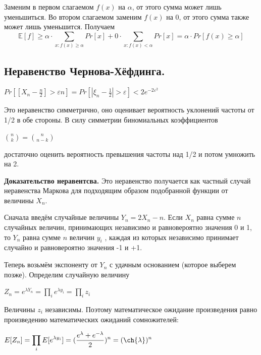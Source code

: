 \documentclass[a4paper, 10pt]{article}
\begin{document}
Заменим в первом слагаемом $f(x)$ на $\alpha$, от этого сумма может лишь уменьшиться. Во втором слагаемом заменим $f(x)$ на 0, от этого сумма также может лишь уменьшится. Получаем $$\mathbb{E}[f] \geqslant \alpha \cdot \sum_{x : f(x) \geqslant \alpha}Pr[x] + 0 \cdot \sum_{x : f(x) < \alpha}Pr[x] = \alpha \cdot Pr[f(x) \geqslant \alpha]$$


\subsection{Неравенство Чернова-Хёфдинга.}

\begin{center}
    $\displaystyle Pr[[X_n - \frac{n}{2}] > \varepsilon n] = Pr[|\xi_n - \frac{1}{2}| > \varepsilon] < 2e^{-2\varepsilon^2}$
\end{center}

Это неравенство симметрично, оно оценивает вероятность уклонений частоты от
1/2 в обе стороны. В силу симметрии биномиальных коэффициентов

\begin{center}
    $\displaystyle \binom{n}{k} = \binom{n}{n - k}$
\end{center}

достаточно оценить вероятность превышения частоты над 1/2 и потом умножить
на 2.

\textbf{Доказательство неравентсва.} Это неравенство получается как частный
случай неравенства Маркова для подходящим образом подобранной функции от
величины $X_n$.

Сначала введём случайные величины $Y_n = 2X_n - n$. Если $X_n$ равна сумме $n$
случайных величин, принимающих независимо и равновероятно значения 0 и 1, то
$Y_n$ равна сумме $n$ величин $y_i$ , каждая из которых независимо принимает случайно
и равновероятно значения -1 и +1.

Теперь возьмём экспоненту от $Y_n$ с удачным основанием (которое выберем позже). Определим случайную величину

\begin{center}
	$\displaystyle Z_n = e^{\lambda Y_n} = \prod_{i} e^{\lambda y_i} = \prod_{i} z_i$
\end{center}

Величины $z_i$ независимы. Поэтому математическое ожидание произведения равно
произведению математических ожиданий сомножителей:

\begin{center}
	$\displaystyle E[Z_n] = \prod_{i} E[e^{\lambda y_i}] = (\frac{e^{\lambda} + e^{-\lambda}}{2})^n = (\ch{\lambda})^n$
\end{center}
\end{document}
